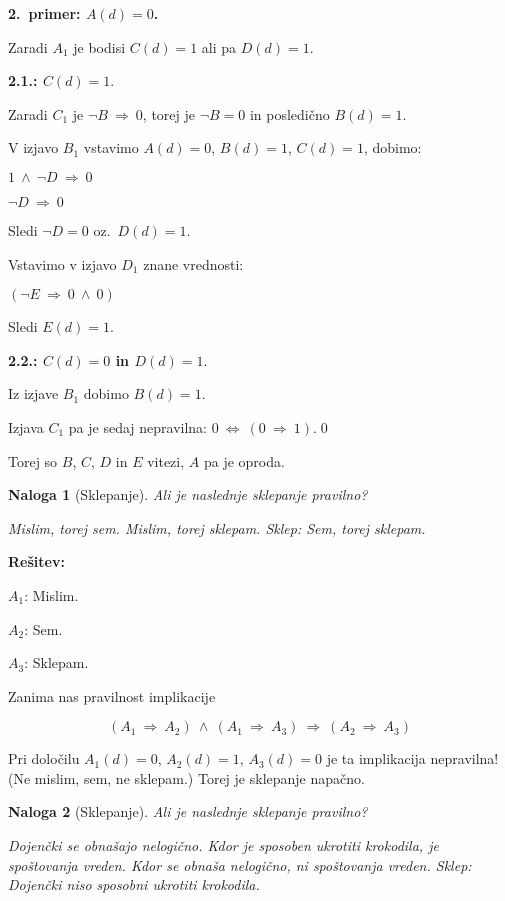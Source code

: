\documentclass[11pt,paper=b5,footinclude,headinclude]{scrbook} %
\def\inn {{~\wedge~}}
\def\sledi {{~\Rightarrow~}}
\def\cee {{~\Leftrightarrow~}}
\newtheorem*{problem}{Naloga}
\begin{document}
\textbf{2.~primer: $A(d) = 0$.}

Zaradi $A_1$ je bodisi $C(d) = 1$ ali pa $D(d) = 1$.

\textbf{2.1.: $C(d) = 1$}.

Zaradi $C_1$ je $\neg B \sledi 0$, torej je $\neg B = 0$ in posledično $B(d) = 1$.

V izjavo $B_1$ vstavimo $A(d) = 0$, $B(d) = 1$, $C(d) = 1$, dobimo:

$1 \inn \neg D\sledi 0$

$\neg D\sledi 0$

Sledi $\neg D = 0$ oz.~$D(d) = 1$.

Vstavimo v izjavo $D_1$ znane vrednosti:

$(\neg E \sledi 0 \inn 0)$

Sledi $E(d) = 1$.

\bigskip

\textbf{2.2.: $C(d) = 0$ in $D(d) = 1$}.

Iz izjave $B_1$ dobimo $B(d) = 1$.

Izjava $C_1$ pa je sedaj nepravilna:
$0 \cee (0\sledi 1)$.\qed

Torej so $B$, $C$, $D$ in $E$ vitezi, $A$ pa je oproda.


\bigskip
\begin{problem}[Sklepanje]
Ali je naslednje sklepanje pravilno?

Mislim, torej sem. Mislim, torej sklepam. Sklep: Sem, torej sklepam.
\end{problem}

\textbf{Rešitev:}

$A_1$: Mislim.

$A_2$: Sem.

$A_3$: Sklepam.

Zanima nas pravilnost implikacije

$$(A_1\sledi A_2)\inn(A_1\sledi A_3)\sledi(A_2\sledi A_3)$$

Pri določilu $A_1(d) = 0$, $A_2(d) = 1$, $A_3(d) = 0$ je ta implikacija nepravilna!
(Ne mislim, sem, ne sklepam.)
Torej je sklepanje napačno.

\bigskip

\begin{problem}[Sklepanje]
Ali je naslednje sklepanje pravilno?

Dojenčki se obnašajo nelogično. Kdor je sposoben ukrotiti krokodila, je spoštovanja vreden.
Kdor se obnaša nelogično, ni spoštovanja vreden. Sklep: Dojenčki niso sposobni ukrotiti krokodila.
\end{problem}
\end{document}
